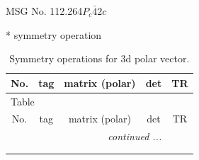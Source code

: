 \documentclass[fleqn,8pt]{jsarticle}
\begin{document}
\setcounter{MaxMatrixCols}{32}

\renewcommand{\tablename}{Table~}
\renewcommand{\figurename}{Figure~}
\begin{center}
\LARGE
MSG No. 112.264\quad$P_{c}\bar{4}2c$
\end{center}
* symmetry operation
\renewcommand{\arraystretch}{1.3}
\begin{longtable}{ccccc}
\caption{Symmetry operations for 3d polar vector.}
 \\
 \hline \hline
No. & tag & matrix (polar) & det & TR \\ \hline \endfirsthead

\multicolumn{4}{l}{\tablename\ \thetable{}} \\
 \hline \hline
No. & tag & matrix (polar) & det & TR \\ \hline \endhead

 \hline \hline
\multicolumn{4}{r}{\footnotesize\it continued ...} \\ \endfoot

 \hline \hline
\multicolumn{4}{r}{} \\ \endlastfoot


\end{longtable}
\end{document}

